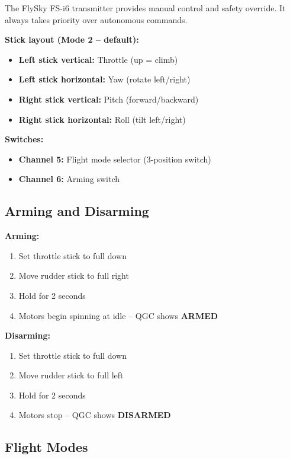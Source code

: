 \documentclass{article}
\begin{document}
The FlySky FS-i6 transmitter provides manual control and safety override. It always takes priority over autonomous commands.

\textbf{Stick layout (Mode 2 -- default):}
\begin{itemize}
    \item \textbf{Left stick vertical:} Throttle (up = climb)
    \item \textbf{Left stick horizontal:} Yaw (rotate left/right)
    \item \textbf{Right stick vertical:} Pitch (forward/backward)
    \item \textbf{Right stick horizontal:} Roll (tilt left/right)
\end{itemize}

\textbf{Switches:}
\begin{itemize}
    \item \textbf{Channel 5:} Flight mode selector (3-position switch)
    \item \textbf{Channel 6:} Arming switch
\end{itemize}

\subsection{Arming and Disarming}

\textbf{Arming:}
\begin{enumerate}
    \item Set throttle stick to full down
    \item Move rudder stick to full right
    \item Hold for 2 seconds
    \item Motors begin spinning at idle -- QGC shows \textbf{ARMED}
\end{enumerate}

\textbf{Disarming:}
\begin{enumerate}
    \item Set throttle stick to full down
    \item Move rudder stick to full left
    \item Hold for 2 seconds
    \item Motors stop -- QGC shows \textbf{DISARMED}
\end{enumerate}

\subsection{Flight Modes}
\end{document}

